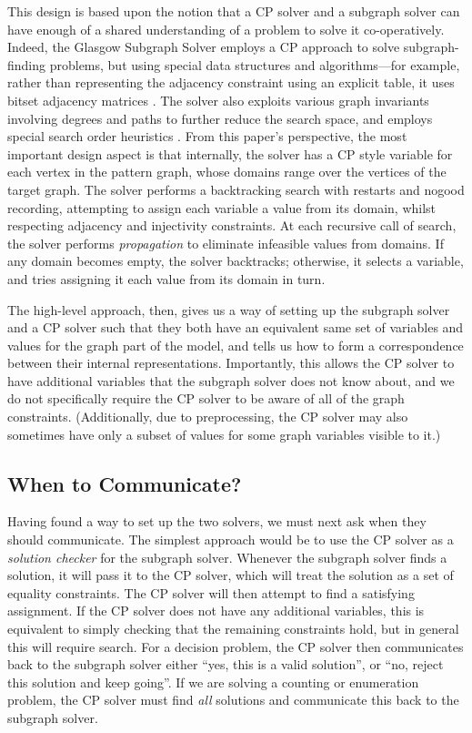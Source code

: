 \documentclass[runningheads]{llncs}
\begin{document}
This design is based upon the notion that a CP solver and a subgraph solver can have enough of a
shared understanding of a problem to solve it co-operatively. Indeed, the Glasgow Subgraph Solver
\cite{DBLP:conf/gg/McCreeshP020} employs a CP approach to solve subgraph-finding problems, but using
special data structures and algorithms---for example, rather than representing the adjacency
constraint using an explicit table, it uses bitset adjacency matrices
\cite{DBLP:conf/cp/McCreeshP15}. The solver also exploits various graph invariants involving degrees
\cite{DBLP:journals/constraints/ZampelliDS10} and paths \cite{DBLP:conf/cp/AudemardLMGP14} to
further reduce the search space, and employs special search order heuristics
\cite{DBLP:conf/cpaior/ArchibaldDHMP019}. From this paper's perspective, the most important design
aspect is that internally, the solver has a CP style variable for each vertex in the pattern graph,
whose domains range over the vertices of the target graph. The solver performs a backtracking search
with restarts and nogood recording, attempting to assign each variable a value from its domain,
whilst respecting adjacency and injectivity constraints. At each recursive call of search, the
solver performs \emph{propagation} to eliminate infeasible values from domains. If any domain
becomes empty, the solver backtracks; otherwise, it selects a variable, and tries assigning it each
value from its domain in turn.

The high-level approach, then, gives us a way of setting up the subgraph solver and a CP solver such
that they both have an equivalent same set of variables and values for the graph part of the model,
and tells us how to form a correspondence between their internal representations. Importantly, this
allows the CP solver to have additional variables that the subgraph solver does not know about, and
we do not specifically require the CP solver to be aware of all of the graph constraints.
(Additionally, due to preprocessing, the CP solver may also sometimes have only a subset of values
for some graph variables visible to it.)

\subsection{When to Communicate?}

Having found a way to set up the two solvers, we must next ask when they should communicate. The
simplest approach would be to use the CP solver as a \emph{solution checker} for the subgraph
solver.  Whenever the subgraph solver finds a solution, it will pass it to the CP solver, which will
treat the solution as a set of equality constraints. The CP solver will then attempt to find a
satisfying assignment. If the CP solver does not have any additional variables, this is equivalent
to simply checking that the remaining constraints hold, but in general this will require search.
For a decision problem, the CP solver then communicates back to the subgraph solver either ``yes,
this is a valid solution'', or ``no, reject this solution and keep going''. If we are solving a
counting or enumeration problem, the CP solver must find \emph{all} solutions and communicate this
back to the subgraph solver.
\end{document}
